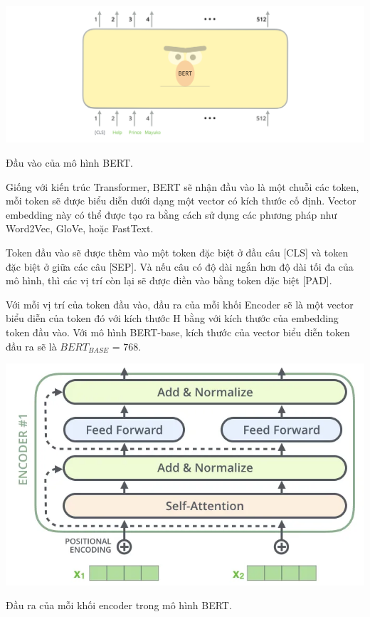 \documentclass[a4paper, 12pt, openany]{book}
\begin{document}
\begin{minipage}{\linewidth}
    \captionsetup{type=figure}
    \centering
    \includegraphics[width=\linewidth]{./assets/images/BERT-input.png}
    \caption{Đầu vào của mô hình BERT.}
\end{minipage}
\vspace{0.5cm}

Giống với kiến trúc Transformer, BERT sẽ nhận đầu vào là một chuỗi các token, mỗi token sẽ được biểu diễn dưới dạng một vector có kích thước cố định. 
Vector embedding này có thể được tạo ra bằng cách sử dụng các phương pháp như Word2Vec, GloVe, hoặc FastText.

Token đầu vào sẽ được thêm vào một token đặc biệt ở đầu câu [CLS] và token đặc biệt ở giữa các câu [SEP]. Và nếu
câu có độ dài ngắn hơn độ dài tối đa của mô hình, thì các vị trí còn lại sẽ được điền vào bằng token đặc biệt [PAD].

Với mỗi vị trí của token đầu vào, đầu ra của mỗi khối Encoder sẽ là một vector biểu diễn của token đó với kích thước H bằng với kích thước của embedding token đầu vào.
Với mô hình BERT-base, kích thước của vector biểu diễn token đầu ra sẽ là \(BERT_{BASE}\) = 768.

\begin{minipage}{\linewidth}
    \captionsetup{type=figure}
    \centering
    \includegraphics[width=.8\linewidth]{./assets/images/BERT-output.png}
    \caption{Đầu ra của mỗi khối encoder trong mô hình BERT.}
\end{minipage}
\vspace{0.5cm}
\end{document}
